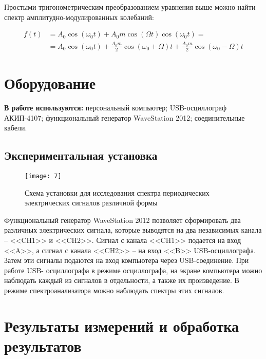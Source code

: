 Простыми
тригонометрическим преобразованием
уравнения выше можно найти спектр
амплитудно-модулированных колебаний:

\begin{equation}
\begin{aligned}
f(t) &= A_{0} \cos \left(\omega_{0} t\right)+A_{0} m \cos (\Omega t) \cos \left(\omega_{0} t\right) =\\ &= A_{0} \cos \left(\omega_{0} t\right)+\frac{A_{0} m}{2} \cos \left(\omega_{0}+\Omega\right) t+\frac{A_{0} m}{2} \cos \left(\omega_{0}-\Omega\right) t
\end{aligned}
\end{equation}

\section{Оборудование}
\textbf{В работе
используются:} персональный компьютер;
USB-осциллограф АКИП-4107;
функциональный генератор WaveStation
2012; соединительные кабели.

\subsection*{Экспериментальная установка}
\begin{figure}[H]
    \texttt{[image: 7]} 
    \captionsetup{justification=centering}
    \caption{Схема установки для
    исследования спектра периодических
электрических сигналов различной формы}
\end{figure}
Функциональный генератор WaveStation
2012 позволяет сформировать два
различных электрических сигнала, которые
выводятся на два независимых канала –
<<CH1>> и <<CH2>>. Сигнал с канала
<<CH1>>
подается на вход <<A>>, а сигнал с канала
<<CH2>> – на вход <<B>> USB-осциллографа.
Затем эти сигналы подаются на вход
компьютера через USB-соединение. При
работе USB- осциллографа в режиме
осциллографа, на экране компьютера можно
наблюдать каждый из сигналов в
отдельности, а также их произведение. В
режиме спектроанализатора можно
наблюдать спектры этих сигналов.

\section{Результаты измерений и обработка результатов}

